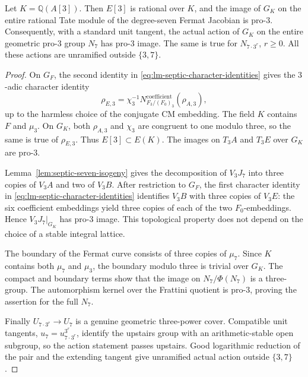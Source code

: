 \begin{proposition}
\label{prop:lm-whole-septic-action}
Let $K=\mathbb Q(A[3])$.  Then $E[3]$ is rational over
$K$, and the image of $G_K$ on the entire rational
Tate module of the degree-seven Fermat Jacobian is
pro-$3$.  Consequently, with a standard unit tangent,
the actual action of $G_K$ on the entire geometric
pro-$3$ group $N_7$ has pro-$3$ image.
The same is true for $N_{7\cdot3^r}$, $r\ge0$.
All these actions are unramified outside $\{3,7\}$.
\end{proposition}
\begin{proof}
On $G_F$, the second identity in
\eqref{eq:lm-septic-character-identities} gives the
$3$-adic character identity
\[
 \rho_{E,3}=
 \chi_3^{-1}N_{F_3/(F_0)_3}^{\mathrm{coefficient}}(\rho_{A,3}),
\]
up to the harmless choice of the conjugate CM embedding.
The field $K$ contains $F$ and $\mu_3$.
On $G_K$, both $\rho_{A,3}$ and $\chi_3$ are congruent
to one modulo three, so the same is true of
$\rho_{E,3}$.  Thus $E[3]\subset E(K)$.
The images on $T_3A$ and $T_3E$ over $G_K$ are pro-$3$.

Lemma~\ref{lem:septic-seven-isogeny} gives the decomposition
of $V_3J_7$ into three copies of $V_3A$ and two of $V_3B$.
After restriction to $G_F$, the first character
identity in \eqref{eq:lm-septic-character-identities}
identifies $V_3B$ with three copies of $V_3E$:
the six coefficient embeddings yield three copies
of each of the two $F_0$-embeddings.
Hence $V_3J_7|_{G_K}$ has pro-$3$ image.
This topological property does not depend on the
choice of a stable integral lattice.

The boundary of the Fermat curve consists of three
copies of $\mu_7$.  Since $K$ contains both $\mu_7$
and $\mu_3$, the boundary modulo three is trivial
over $G_K$.  The compact and boundary terms show
that the image on $N_7/\Phi(N_7)$ is a three-group.
The automorphism kernel over the Frattini quotient
is pro-$3$, proving the assertion for the full $N_7$.

Finally $U_{7\cdot3^r}\to U_7$ is a genuine geometric
three-power cover.  Compatible unit tangents,
$u_7=u_{7\cdot3^r}^{3^r}$, identify the upstairs group
with an arithmetic-stable open subgroup, so the
action statement passes upstairs.  Good logarithmic
reduction of the pair and the extending tangent
give unramified actual action outside $\{3,7\}$.
\end{proof}


